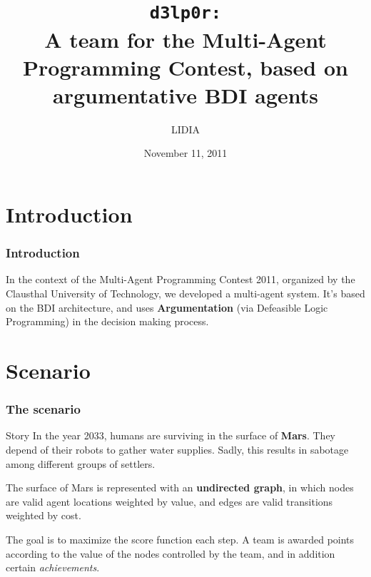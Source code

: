 \documentclass[pdf,xcolor=svgnames]{beamer}
\title[d3lp0r]{\texttt{d3lp0r:}\\\large{A team for the Multi-Agent Programming Contest, based on argumentative BDI agents}}
\author{LIDIA}
\institute{Universidad Nacional del Sur} %
\date{November 11, 2011}
\begin{document}


\begin{frame}
\titlepage

\end{frame}



\section{Introduction}

\begin{frame}
\frametitle{Introduction}
\begin{block}{}
In the context of the Multi-Agent Programming Contest 2011, organized by the Clausthal University of
 Technology, we developed a multi-agent system. It's based on the BDI architecture, and uses \textbf{Argumentation} (via Defeasible Logic Programming) in the decision making process.
\end{block}
\end{frame}


\section{Scenario}

\begin{frame}

\frametitle{The scenario}

\begin{block}{Story}
In the year 2033, humans are surviving in the surface of \textbf{Mars}. They 
depend of their robots to gather water supplies. Sadly, this results in sabotage among different groups of settlers.
\end{block}
\pause

The surface of Mars is represented with an \textbf{undirected graph}, in which 
nodes are valid agent locations weighted by value, and edges are valid
transitions weighted by cost. 
\pause

The goal is to maximize the score function each step. A team is awarded
points according to the value of the nodes controlled by the team, and
in addition certain \textit{achievements}.
\end{frame}
\end{document}
